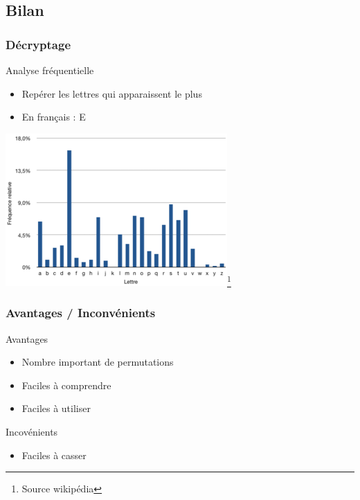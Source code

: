 \documentclass[xcolor={dvipsnames}]{beamer}
\begin{document}
\subsection{Bilan}

\begin{frame}
\frametitle{Décryptage}

\begin{block}{Analyse fréquentielle}
	\begin{itemize}
		\item Repérer les lettres qui apparaissent le plus
		\item En français : E
	\end{itemize}
\end{block}

\begin{center}
	\includegraphics[scale=0.6]{freq}\footnote{Source wikipédia}
\end{center}	

\end{frame}

\begin{frame}
\frametitle{Avantages / Inconvénients}

\begin{exampleblock}{Avantages}
	\begin{itemize}
		\item Nombre important de permutations
		\item Faciles à comprendre
		\item Faciles à utiliser
	\end{itemize}
\end{exampleblock}

\begin{alertblock}{Incovénients}
	\begin{itemize}
		\item Faciles à casser
	\end{itemize}
\end{alertblock}
\end{frame}
\end{document}
